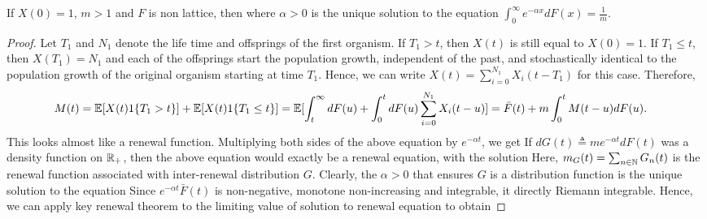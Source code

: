 \documentclass[a4paper,10pt,english]{article}
\begin{document}
\begin{thm}
If $X(0)=1$, $m>1$ and $F$ is non lattice, then
where $\alpha > 0$ is the unique solution to the equation $\int_{0}^{\infty}e^{-\alpha x } dF(x) = \frac{1}{m}$.
\end{thm}
\begin{proof}
Let $T_1$ and $N_1$ denote the life time and offsprings of the first organism. 
If $T_1 > t$, then $X(t)$ is still equal to $X(0) = 1$. 
If $T_1 \leq t$, then $X(T_1) = N_1$ and each of the offsprings start the population growth, 
independent of the past, and stochastically identical to the population growth of the original organism starting at time $T_1$. 
Hence, we can write $X(t) = \sum_{i=0}^{N_1}X_i(t-T_1)$ for this case.  
Therefore, 
\begin{align*}
M(t) &= \E[X(t)1\{T_1 > t\}] + \E[X(t)1\{T_1 \leq t\}] %
= \E[\int_{t}^{\infty}dF(u) + \int_{0}^{t}dF(u)\sum_{i=0}^{N_1}X_i(t-u)] = \bar{F}(t) + m\int_{0}^{t}M(t-u)dF(u).
\end{align*}
This looks almost like a renewal function. 
Multiplying both sides of the above equation by $e^{-\alpha t}$, we get 
If $dG(t) \triangleq me^{-\alpha t}dF(t)$ was a density function on $\mathbb{R}_+$, then the above equation would exactly be a renewal equation, with the solution
Here, $m_G(t) = \sum_{n \in \mathbb{N}}G_n(t)$ is the renewal function associated with inter-renewal distribution $G$. 
Clearly, the $\alpha > 0$ that ensures $G$ is a distribution function is the unique solution to the equation
Since $e^{-\alpha t}\bar{F}(t)$ is non-negative, monotone non-increasing and integrable, it directly Riemann integrable. 
Hence, we can apply key renewal theorem to the limiting value of solution to renewal equation to obtain 


\end{proof}
\end{document}
